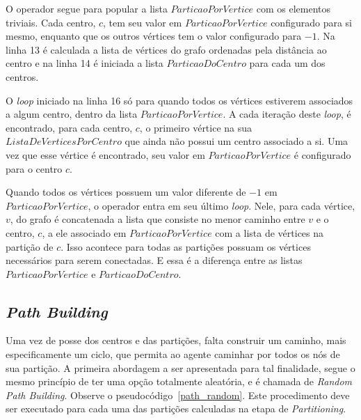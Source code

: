O operador segue para popular a lista $ParticaoPorVertice$ com os elementos 
triviais. Cada centro, $c$, tem seu valor em $ParticaoPorVertice$ configurado 
para si mesmo, enquanto que os outros vértices tem o valor configurado para $-1$. 
Na linha 13 é calculada a lista de vértices do grafo ordenadas pela distância ao 
centro e na linha 14 é iniciada a lista $ParticaoDoCentro$ para cada um dos 
centros.

O \textit{loop} iniciado na linha 16 só para quando todos os vértices estiverem 
associados a algum centro, dentro da lista $ParticaoPorVertice$. A cada iteração 
deste \textit{loop}, é encontrado, para cada centro, $c$, o primeiro vértice na 
sua $ListaDeVerticesPorCentro$  que ainda não possui um centro associado a si. 
Uma vez que esse vértice é encontrado, seu valor em $ParticaoPorVertice$ é 
configurado para o centro $c$.

Quando todos os vértices possuem um valor diferente de $-1$ em 
$ParticaoPorVertice$, o operador entra em seu último \textit{loop}. Nele, para 
cada vértice, $v$, do grafo é concatenada a lista que consiste no menor caminho 
entre $v$ e o centro, $c$, a ele associado em $ParticaoPorVertice$ com a lista 
de vértices na partição de $c$. Isso acontece para todas as partições possuam os 
vértices necessários para serem conectadas. E essa é a diferença entre as listas 
$ParticaoPorVertice$ e $ParticaoDoCentro$.

\subsection{\textit{Path Building}}
\label{path_building}

Uma vez de posse dos centros e das partições, falta construir um caminho, mais 
especificamente um ciclo, que permita ao agente caminhar por todos os nós de 
sua partição. A primeira abordagem a ser apresentada para tal finalidade, segue 
o mesmo princípio de ter uma opção totalmente aleatória, e é chamada de 
\textit{Random Path Building}. Observe o pseudocódigo~\ref{path_random}. Este 
procedimento deve ser executado para cada uma das partições calculadas na etapa 
de \textit{Partitioning}.

